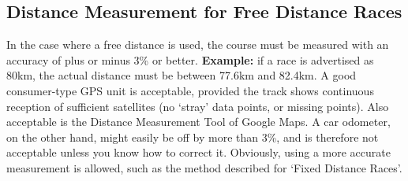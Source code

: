 \subsection {Distance Measurement for Free Distance Races}

In the case where a free distance is used, the course must be measured with an accuracy of plus or minus 3\% or better.
\textbf{Example:} if a race is advertised as 80\unit{km}, the actual distance must be between 77.6\unit{km} and 82.4\unit{km}.
A good consumer-type GPS unit is acceptable, provided the track shows continuous reception of sufficient satellites (no `stray' data points, or missing points).
Also acceptable is the Distance Measurement Tool of Google Maps.
A car odometer, on the other hand, might easily be off by more than 3\%, and is therefore not acceptable unless you know how to correct it.
Obviously, using a more accurate measurement is allowed, such as the method described for `Fixed Distance Races'.
